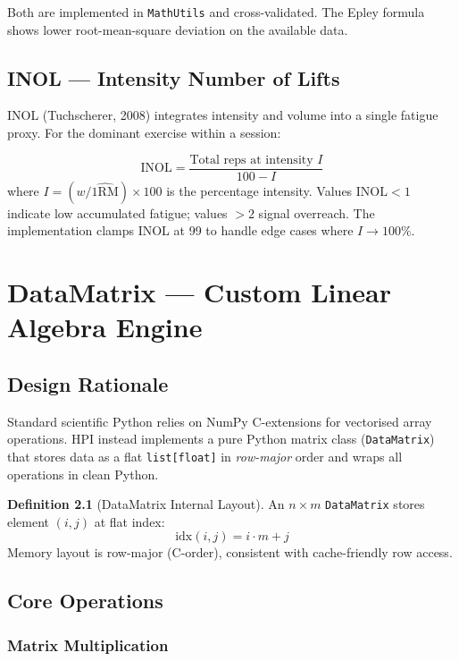 \documentclass[12pt,a4paper]{report}
\theoremstyle{definition}
\newtheorem{definition}{Definition}[chapter]
\begin{document}
Both are implemented in \texttt{MathUtils} and cross-validated. The Epley
formula shows lower root-mean-square deviation on the available data.

\section{INOL — Intensity Number of Lifts}

INOL (Tuchscherer, 2008) integrates intensity and volume into a single fatigue
proxy. For the dominant exercise within a session:

\[
  \text{INOL} = \frac{\text{Total reps at intensity } I}{100 - I}
\]
where $I = (w / \widehat{1\text{RM}}) \times 100$ is the percentage intensity.
Values $\text{INOL} < 1$ indicate low accumulated fatigue; values $> 2$ signal
overreach. The implementation clamps INOL at 99 to handle edge cases where
$I \to 100\%$.

\chapter{DataMatrix — Custom Linear Algebra Engine}

\section{Design Rationale}

Standard scientific Python relies on NumPy C-extensions for vectorised
array operations. HPI instead implements a pure Python matrix class
(\texttt{DataMatrix}) that stores data as a flat \texttt{list[float]} in
\emph{row-major} order and wraps all operations in clean Python.

\begin{definition}[DataMatrix Internal Layout]
An $n \times m$ \texttt{DataMatrix} stores element $(i, j)$ at flat index:
\[
  \text{idx}(i, j) = i \cdot m + j
\]
Memory layout is row-major (C-order), consistent with cache-friendly row access.
\end{definition}

\section{Core Operations}

\subsection{Matrix Multiplication}
\end{document}

